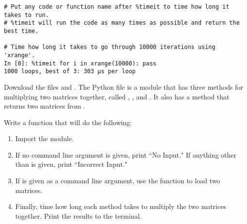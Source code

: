 \begin{lstlisting}
# Put any code or function name after %timeit to time how long it takes to run.
# %timeit will run the code as many times as possible and return the best time.

# Time how long it takes to go through 10000 iterations using 'xrange'.
In [0]: %timeit for i in xrange(10000): pass 
1000 loops, best of 3: 303 µs per loop
\end{lstlisting}

\begin{problem}
Download the files  and .
The Python file  is a module that has three methods for multiplying two matrices together, called , , and .
It also has a  method that returns two matrices from .

Write a function that will do the following:
\begin{enumerate}
\item Import the  module.
\item If no command line argument is given, print ``No Input."  If anything other than  is given, print ``Incorrect Input."
\item If  is given as a command line argument, use the  function to load two matrices.
\item Finally, time how long each method takes to multiply the two matrices together. Print the results to the terminal.
\end{enumerate}
\end{problem}

